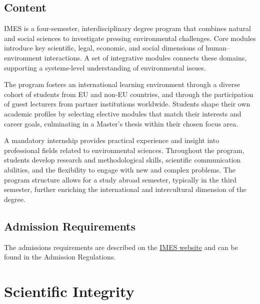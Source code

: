 \documentclass[
  letterpaper,
  10pt,
  openany]{book}
\begin{document}
\section*{Content}\label{content}


IMES is a four-semester, interdisciplinary degree program that combines
natural and social sciences to investigate pressing environmental
challenges. Core modules introduce key scientific, legal, economic, and
social dimensions of human--environment interactions. A set of
integrative modules connects these domains, supporting a systems-level
understanding of environmental issues.

The program fosters an international learning environment through a
diverse cohort of students from EU and non-EU countries, and through the
participation of guest lecturers from partner institutions worldwide.
Students shape their own academic profiles by selecting elective modules
that match their interests and career goals, culminating in a Master's
thesis within their chosen focus area.

A mandatory internship provides practical experience and insight into
professional fields related to environmental sciences. Throughout the
program, students develop research and methodological skills, scientific
communication abilities, and the flexibility to engage with new and
complex problems. The program structure allows for a study abroad
semester, typically in the third semester, further enriching the
international and intercultural dimension of the degree.

\section*{Admission Requirements}\label{admission-requirements}


The admissions requirements are described on the
\href{https://imes.uni-koeln.de/prospective-students/apply-for-the-imes-masters-program}{IMES
website} and can be found in the Admission Regulations.

\chapter*{Scientific Integrity}\label{scientific-integrity}
\end{document}
